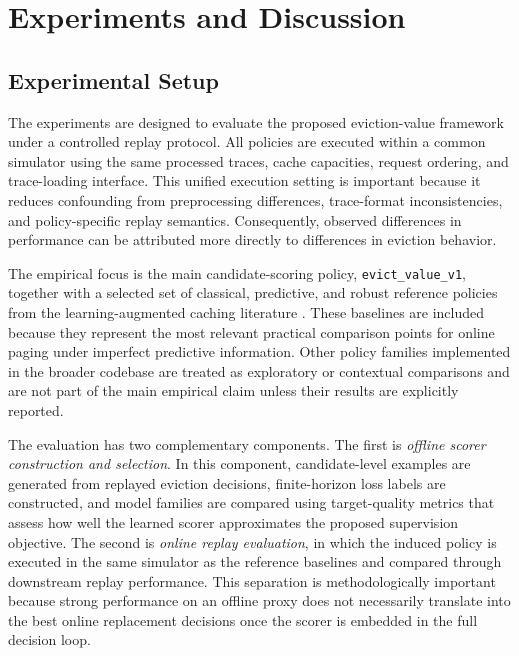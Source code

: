 \documentclass[preprint,12pt]{elsarticle}
\begin{document}
\section{Experiments and Discussion}
\label{sec:experiments}


\subsection{Experimental Setup}
\label{subsec:experimental_setup}

The experiments are designed to evaluate the proposed eviction-value framework under a controlled replay protocol. All policies are executed within a common simulator using the same processed traces, cache capacities, request ordering, and trace-loading interface. This unified execution setting is important because it reduces confounding from preprocessing differences, trace-format inconsistencies, and policy-specific replay semantics. Consequently, observed differences in performance can be attributed more directly to differences in eviction behavior.

The empirical focus is the main candidate-scoring policy, \texttt{evict\_value\_v1}, together with a selected set of classical, predictive, and robust reference policies from the learning-augmented caching literature \cite{lykouris2021competitive_caching,antoniadis2020online_metric_untrusted,wei2020better_simpler_lac,chledowski2021robust_lac_experimental}. These baselines are included because they represent the most relevant practical comparison points for online paging under imperfect predictive information. Other policy families implemented in the broader codebase are treated as exploratory or contextual comparisons and are not part of the main empirical claim unless their results are explicitly reported.

The evaluation has two complementary components. The first is \emph{offline scorer construction and selection}. In this component, candidate-level examples are generated from replayed eviction decisions, finite-horizon loss labels are constructed, and model families are compared using target-quality metrics that assess how well the learned scorer approximates the proposed supervision objective. The second is \emph{online replay evaluation}, in which the induced policy is executed in the same simulator as the reference baselines and compared through downstream replay performance. This separation is methodologically important because strong performance on an offline proxy does not necessarily translate into the best online replacement decisions once the scorer is embedded in the full decision loop.
\end{document}

